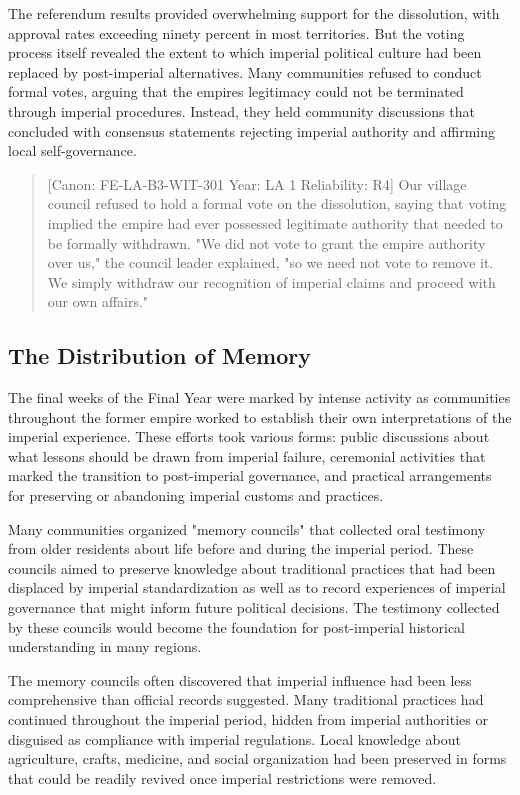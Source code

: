 The referendum results provided overwhelming support for the
dissolution, with approval rates exceeding ninety percent in most
territories. But the voting process itself revealed the extent to which
imperial political culture had been replaced by post-imperial
alternatives. Many communities refused to conduct formal votes, arguing
that the empire\textquotesingle s legitimacy could not be terminated
through imperial procedures. Instead, they held community discussions
that concluded with consensus statements rejecting imperial authority
and affirming local self-governance.

\begin{quote}
{[}Canon: FE-LA-B3-WIT-301 \textbar{} Year: LA 1 \textbar{} Reliability:
R4{]} Our village council refused to hold a formal vote on the
dissolution, saying that voting implied the empire had ever possessed
legitimate authority that needed to be formally withdrawn. "We did not
vote to grant the empire authority over us," the council leader
explained, "so we need not vote to remove it. We simply withdraw our
recognition of imperial claims and proceed with our own affairs."
\end{quote}

\subsection{The Distribution of
Memory}\label{the-distribution-of-memory}

The final weeks of the Final Year were marked by intense activity as
communities throughout the former empire worked to establish their own
interpretations of the imperial experience. These efforts took various
forms: public discussions about what lessons should be drawn from
imperial failure, ceremonial activities that marked the transition to
post-imperial governance, and practical arrangements for preserving or
abandoning imperial customs and practices.

Many communities organized "memory councils" that collected oral
testimony from older residents about life before and during the imperial
period. These councils aimed to preserve knowledge about traditional
practices that had been displaced by imperial standardization as well as
to record experiences of imperial governance that might inform future
political decisions. The testimony collected by these councils would
become the foundation for post-imperial historical understanding in many
regions.

The memory councils often discovered that imperial influence had been
less comprehensive than official records suggested. Many traditional
practices had continued throughout the imperial period, hidden from
imperial authorities or disguised as compliance with imperial
regulations. Local knowledge about agriculture, crafts, medicine, and
social organization had been preserved in forms that could be readily
revived once imperial restrictions were removed.

